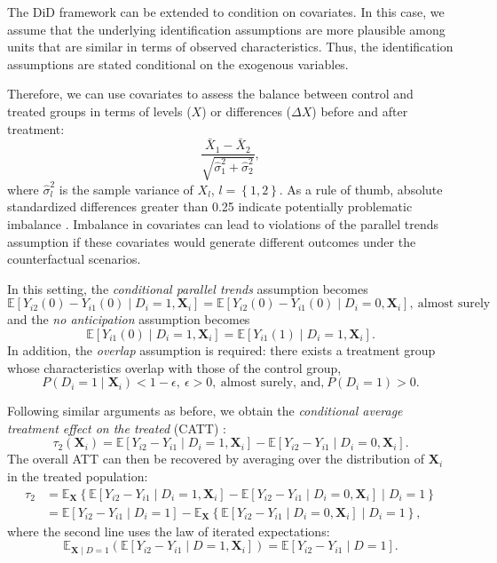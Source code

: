 The DiD framework can be extended to condition on covariates. In this case, we assume that the underlying identification assumptions are more plausible among units that are similar in terms of observed characteristics. Thus, the identification assumptions are stated conditional on the exogenous variables.

Therefore, we can use covariates to assess the balance between control and treated groups in terms of levels ($X$) or differences ($\Delta X$) before and after treatment:
\[
\frac{\bar{X}_1-\bar{X}_2}{\sqrt{\hat{\sigma}_1^2+\hat{\sigma}_2^2}},
\] 
where $\hat{\sigma}_l^2$ is the sample variance of $X_l$, $l=\left\{1,2\right\}$. 
As a rule of thumb, absolute standardized differences greater than 0.25 indicate potentially problematic imbalance \cite{baker2025did_guide}. Imbalance in covariates can lead to violations of the parallel trends assumption if these covariates would generate different outcomes under the counterfactual scenarios.

In this setting, the \textit{conditional parallel trends} assumption becomes
\begin{equation}
	\mathbb{E}[Y_{i2}(0) - Y_{i1}(0) \mid D_i = 1, \mathbf{X}_i] 
	= \mathbb{E}[Y_{i2}(0) - Y_{i1}(0) \mid D_i = 0, \mathbf{X}_i], \ \text{almost surely}
\end{equation}
and the \textit{no anticipation} assumption becomes
\begin{equation}
	\mathbb{E}[Y_{i1}(0) \mid D_i = 1, \mathbf{X}_i] 
	= \mathbb{E}[Y_{i1}(1) \mid D_i = 1, \mathbf{X}_i].
\end{equation} 
In addition, the \textit{overlap} assumption is required: there exists a treatment group whose characteristics overlap with those of the control group,
\[
P(D_i = 1 \mid \mathbf{X}_i) < 1 - \epsilon, \ \epsilon >0, \ \text{almost surely, and,} \ P(D_i=1)>0.
\]

Following similar arguments as before, we obtain the \textit{conditional average treatment effect on the treated} (CATT) \cite{baker2025did_guide}:
\[
\tau_2(\mathbf{X}_i)= \mathbb{E}[Y_{i2} - Y_{i1} \mid D_i = 1, \mathbf{X}_i] - \mathbb{E}[Y_{i2} - Y_{i1} \mid D_i = 0, \mathbf{X}_i].
\]
The overall ATT can then be recovered by averaging over the distribution of $\mathbf{X}_i$ in the treated population:
\begin{align*}
	\tau_2 & = \mathbb{E}_{\mathbf{X}}\left\{\mathbb{E}[Y_{i2} - Y_{i1} \mid D_i = 1, \mathbf{X}_i] - \mathbb{E}[Y_{i2} - Y_{i1} \mid D_i = 0, \mathbf{X}_i] \mid D_i = 1\right\}\\
	&=\mathbb{E}[Y_{i2} - Y_{i1} \mid D_i = 1]-\mathbb{E}_{\mathbf{X}}\left\{\mathbb{E}[Y_{i2} - Y_{i1} \mid D_i = 0, \mathbf{X}_i]\mid D_i=1\right\},
\end{align*}
where the second line uses the law of iterated expectations:
\[
\mathbb{E}_{\mathbf{X}\mid D=1}\!\left( \mathbb{E}[Y_{i2}-Y_{i1} \mid D=1, \mathbf{X}_i] \right) 
= \mathbb{E}[Y_{i2}-Y_{i1} \mid D=1].
\]

